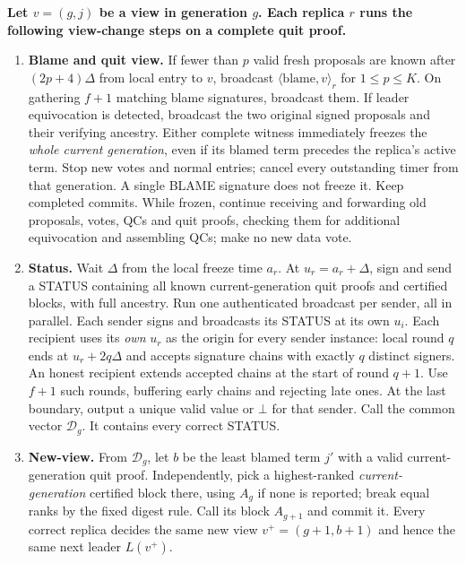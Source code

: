 \documentclass[10pt,a4paper]{article}
\newcommand{\RR}[1]{{\color{red!70!black}#1}}
\newcommand{\decide}{\mathcal D}
\begin{document}
\medskip
\begin{minipage}{\linewidth}
\begin{mdframed}[linewidth=.65pt,innertopmargin=5pt,innerbottommargin=5pt]
\textbf{Let $v=(g,j)$ be a view in generation $g$. Each replica $r$
runs the following view-change steps on a complete quit proof.}
\begin{enumerate}[label=\roman*),itemsep=3pt]
\item \textbf{Blame and quit view.} If fewer than $p$ valid fresh proposals
are known after $(2p+4)\Delta$ from local entry to $v$, broadcast
$\langle\mathrm{blame},v\rangle_r$ for $1\le p\le K$.
On gathering $f+1$ matching blame signatures, broadcast them.
If leader equivocation is detected, broadcast the two original signed
proposals and their verifying ancestry.
\RR{Either complete witness immediately freezes the \emph{whole current
generation}, even if its blamed term precedes the replica's active term.
Stop new votes and normal entries; cancel every outstanding timer from that
generation. A single BLAME signature does not freeze it. Keep completed commits. While frozen, continue receiving and
forwarding old proposals, votes, QCs and quit proofs, checking them for
additional equivocation and assembling QCs; make no new data vote.}

\item \textbf{Status.} Wait $\Delta$ from the local freeze time $a_r$.
\RR{At $u_r=a_r+\Delta$, sign and send a STATUS containing all known
current-generation quit proofs and certified blocks, with full ancestry.
Run one authenticated broadcast per sender, all in parallel.
Each sender signs and broadcasts its STATUS at its own $u_i$. Each
recipient uses its \emph{own} $u_r$ as the origin for every sender instance:
local round $q$ ends at $u_r+2q\Delta$ and accepts signature chains with
exactly $q$ distinct signers. An honest recipient extends accepted chains
at the start of round $q+1$. Use $f+1$ such rounds, buffering early
chains and rejecting late ones. At the last boundary, output a unique
valid value or $\bot$ for that sender. Call the common vector $\decide_g$.
It contains every correct STATUS.}

\item \textbf{New-view.} \RR{From $\decide_g$, let $b$ be the least blamed
term $j'$ with a valid current-generation quit proof. Independently, pick
a highest-ranked \emph{current-generation} certified block there, using
$A_g$ if none is reported; break equal ranks by the fixed digest rule.
Call its block $A_{g+1}$ and commit it. Every correct replica decides the
same new view $v^+=(g+1,b+1)$ and hence the same next leader $L(v^+)$.}


\end{enumerate}
\end{mdframed}
\end{minipage}
\end{document}
